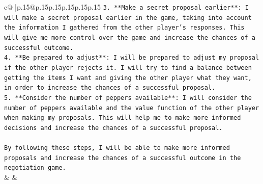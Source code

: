 \documentclass{article}
\begin{document}
{\begin{supertabular}{c@{$\;$}|p{.15\linewidth}@{}p{.15\linewidth}p{.15\linewidth}p{.15\linewidth}p{.15\linewidth}p{.15\linewidth}}
{{{\texttt{3. **Make a secret proposal earlier**: I will make a secret proposal earlier in the game, taking into account the information I gathered from the other player's responses. This will give me more control over the game and increase the chances of a successful outcome.} \\
\texttt{4. **Be prepared to adjust**: I will be prepared to adjust my proposal if the other player rejects it. I will try to find a balance between getting the items I want and giving the other player what they want, in order to increase the chances of a successful proposal.} \\
\texttt{5. **Consider the number of peppers available**: I will consider the number of peppers available and the value function of the other player when making my proposals. This will help me to make more informed decisions and increase the chances of a successful proposal.} \\
\\ 
\texttt{By following these steps, I will be able to make more informed proposals and increase the chances of a successful outcome in the negotiation game.} \\
            }
        }
    }
    & & \\ \\


\end{supertabular}}
\end{document}
